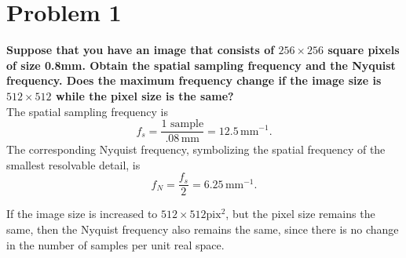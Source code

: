 \documentclass[aps,letterpaper,10pt]{article}
\begin{document}
\section{Problem 1}
\textbf{Suppose that you have an image that consists of $256\times256$ square pixels of size 0.8mm.  Obtain the spatial sampling frequency and the Nyquist frequency. Does the maximum frequency change if the image size is $512\times512$ while the pixel size is the same?}\\

The spatial sampling frequency is $$f_s=\frac{1 \text{ sample}}{.08\,\text{mm}} = 12.5\,\text{mm}^{-1}.$$
The corresponding Nyquist frequency, symbolizing the spatial frequency of the smallest resolvable detail, is $$f_N=\frac{f_s}{2} = 6.25\,\text{mm}^{-1}.$$

If the image size is increased to $512\times512\text{pix}^2$, but the pixel size remains the same, then the Nyquist frequency also remains the same, since there is no change in the number of samples per unit real space.
\end{document}

